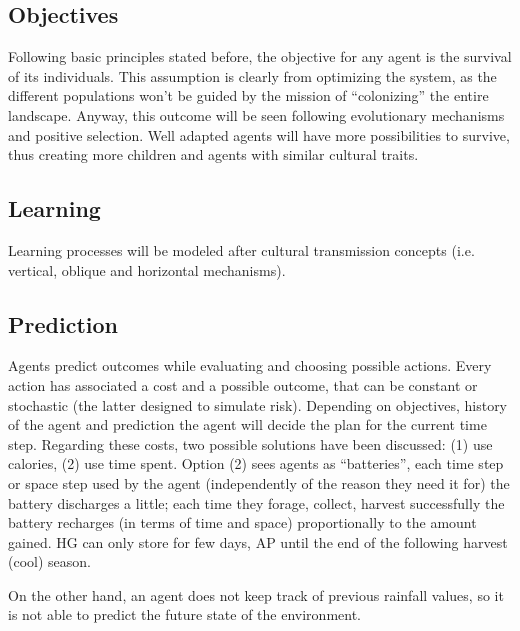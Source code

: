 \begin{enumerate}
\begin{enumerate}
\begin{enumeration}
\begin{enumerate}
\begin{enumerate}
\begin{enumerate}
\subsection{Objectives}
Following basic principles stated before, the objective for any agent is the survival of its individuals.
This assumption is clearly from optimizing the system, as the different populations won't be guided by
the mission of “colonizing” the entire landscape. Anyway, this outcome will be seen following
evolutionary mechanisms and positive selection. Well adapted agents will have more possibilities to
survive, thus creating more children and agents with similar cultural traits.

\subsection{Learning}
Learning processes will be modeled after cultural transmission concepts (i.e. vertical, oblique and
horizontal mechanisms).

\subsection{Prediction}
Agents predict outcomes while evaluating and choosing possible actions. Every action has associated
a cost and a possible outcome, that can be constant or stochastic (the latter designed to simulate
risk). Depending on objectives, history of the agent and prediction the agent will decide the plan for the
current time step.
Regarding these costs, two possible solutions have been discussed: (1) use calories, (2) use time
spent. Option (2) sees agents as “batteries”, each time step or space step used by the agent
(independently of the reason they need it for) the battery discharges a little; each time they forage,
collect, harvest successfully the battery recharges (in terms of time and space) proportionally to the
amount gained. HG can only store for few days, AP until the end of the following harvest (cool)
season.

On the other hand, an agent does not keep track of previous rainfall values, so it is not able to predict
the future state of the environment.


\end{enumerate}
\end{enumerate}
\end{enumerate}
\end{enumeration}
\end{enumerate}
\end{enumerate}
